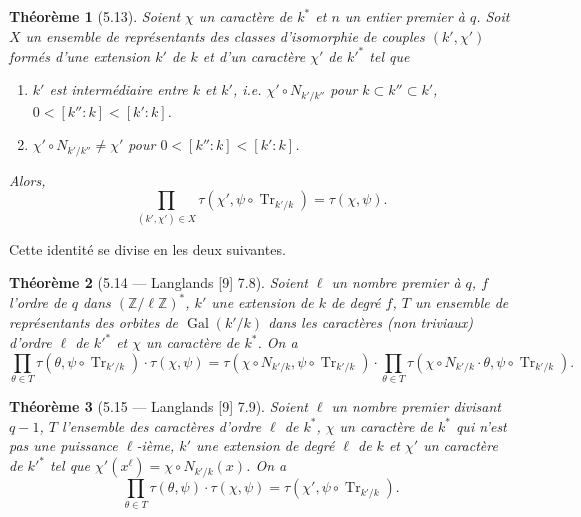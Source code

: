 \documentclass[11pt]{amsart}
\theoremstyle{plain}
\newtheorem{theorem}{Th\'eor\`eme}[section]
\theoremstyle{definition}
\DeclareMathOperator{\Gal}{Gal}
\begin{document}
\begin{theorem}[5.13]
Soient $\chi$ un caract\`ere de $k^*$ et $n$ un entier premier \`a $q$. Soit $X$ un ensemble de repr\'esentants des classes d'isomorphie de couples $(k', \chi')$ form\'es d'une extension $k'$ de $k$ et d'un caract\`ere $\chi'$ de $k'^*$ tel que
\begin{enumerate}
\item[(a)] $k'$ est interm\'ediaire entre $k$ et $k'$, i.e. $\chi' \circ N_{k'/k''}$ pour $k \subset k'' \subset k'$, $0 < [k'':k] < [k':k]$.
\item[(b)] $\chi' \circ N_{k'/k''} \not= \chi'$ pour $0 < [k'':k] < [k':k]$.
\end{enumerate}
Alors,
\begin{equation}
\prod_{(k', \chi') \in X} \tau(\chi', \psi \circ \operatorname{Tr}_{k'/k}) = \tau(\chi, \psi).
\tag{5.13.1}
\end{equation}
\end{theorem}

Cette identit\'e se divise en les deux suivantes.

\begin{theorem}[5.14 --- Langlands {[9]} 7.8]
Soient $\ell$ un nombre premier \`a $q$, $f$ l'ordre de $q$ dans $(\mathbb{Z}/\ell\mathbb{Z})^*$, $k'$ une extension de $k$ de degr\'e $f$, $T$ un ensemble de repr\'esentants des orbites de $\Gal(k'/k)$ dans les caract\`eres (non triviaux) d'ordre $\ell$ de $k'^*$ et $\chi$ un caract\`ere de $k^*$. On a
\[
\prod_{\theta \in T} \tau(\theta, \psi \circ \operatorname{Tr}_{k'/k}) \cdot \tau(\chi, \psi) = \tau(\chi \circ N_{k'/k}, \psi \circ \operatorname{Tr}_{k'/k}) \cdot \prod_{\theta \in T} \tau(\chi \circ N_{k'/k} \cdot \theta, \psi \circ \operatorname{Tr}_{k'/k}).
\]
\end{theorem}

\begin{theorem}[5.15 --- Langlands {[9]} 7.9]
Soient $\ell$ un nombre premier divisant $q-1$, $T$ l'ensemble des caract\`eres d'ordre $\ell$ de $k^*$, $\chi$ un caract\`ere de $k^*$ qui n'est pas une puissance $\ell$-i\`eme, $k'$ une extension de degr\'e $\ell$ de $k$ et $\chi'$ un caract\`ere de $k'^*$ tel que $\chi'(x^\ell) = \chi \circ N_{k'/k}(x)$. On a
\[
\prod_{\theta \in T} \tau(\theta, \psi) \cdot \tau(\chi, \psi) = \tau(\chi', \psi \circ \operatorname{Tr}_{k'/k}).
\]
\end{theorem}
\end{document}
